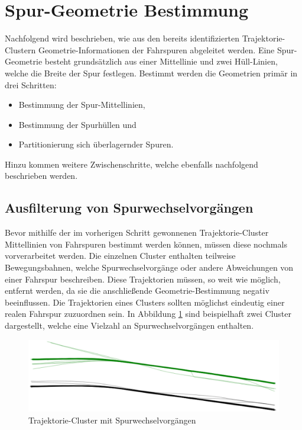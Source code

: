 
\section{Spur-Geometrie Bestimmung}
\label{cha:lane_definition}

Nachfolgend wird beschrieben, wie aus den bereits identifizierten Trajektorie-Clustern
Geometrie-Informationen der Fahrspuren abgeleitet werden. Eine Spur-Geometrie besteht grundsätzlich
aus einer Mittellinie und zwei Hüll-Linien, welche die Breite der Spur festlegen.
Bestimmt werden die Geometrien primär in drei Schritten:

\begin{itemize}
    \item Bestimmung der Spur-Mittellinien,
    \item Bestimmung der Spurhüllen und
    \item Partitionierung sich überlagernder Spuren.
\end{itemize}

Hinzu kommen weitere Zwischenschritte, welche ebenfalls nachfolgend beschrieben werden.

\subsection{Ausfilterung von Spurwechselvorgängen}
\label{sec:real2_filter_lane_change}

Bevor mithilfe der im vorherigen Schritt gewonnenen Trajektorie-Cluster Mittellinien von Fahrspuren bestimmt
werden können, müssen diese nochmals vorverarbeitet werden. Die einzelnen Cluster enthalten teilweise
Bewegungsbahnen, welche Spurwechselvorgänge oder andere Abweichungen von einer Fahrspur beschreiben.
Diese Trajektorien müssen, so weit wie möglich,
entfernt werden, da sie die anschließende Geometrie-Bestimmung negativ beeinflussen. Die Trajektorien
eines Clusters sollten möglichst eindeutig einer realen Fahrspur zuzuordnen sein. In Abbildung
\ref{fig:real2_clusters_pre_postpro} sind beispielhaft zwei Cluster dargestellt, welche eine Vielzahl an
Spurwechselvorgängen enthalten.

\begin{figure}[H]
    \centering
    \includegraphics[width=0.8\linewidth]{resources/img/umsetzung/U2/Clusters_Pre_Postprocessing}
    \caption{Trajektorie-Cluster mit Spurwechselvorgängen}
    \label{fig:real2_clusters_pre_postpro}
\end{figure}

